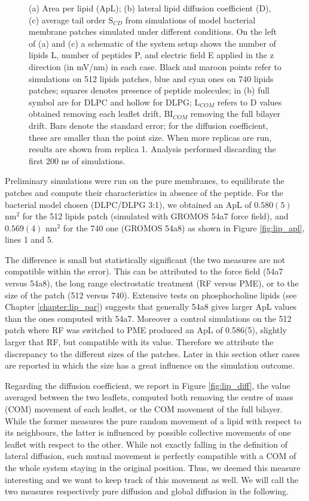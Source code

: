 \begin{figure}
\begin{minipage}{5.7cm}
\end{minipage}
\caption[ApL, D and S$_{CD}$ for membrane simulations]{(a) Area per lipid (ApL); (b) lateral lipid diffusion coefficient (D), (c) average tail order S$_{CD}$ from simulations of model bacterial membrane patches simulated under different conditions. On the left of (a) and (c) a schematic of the system setup shows the number of lipids L, number of peptides P, and electric field E applied in the z direction (in mV/nm) in each case. Black and maroon points refer to simulations on 512 lipids patches, blue and cyan ones on 740 lipids patches; squares denotes presence of peptide molecules; in (b) full symbol are for DLPC and hollow for DLPG; L$_{COM}$ refers to D values obtained removing each leaflet drift, BI$_{COM}$ removing the full bilayer drift. Bars denote the standard error; for the diffusion coefficient, these are smaller than the point size. When more replicas are run, results are shown from replica 1. Analysis performed discarding the first 200 ns of simulations.}
\label{fig:lipids_ApL_D}
\end{figure}

Preliminary simulations were run on the pure membranes, to equilibrate the patches and compute their characteristics in absence of the peptide.
%
For the bacterial model chosen (DLPC/DLPG 3:1), we obtained an ApL of $0.580(5)$ nm$^2$ for the 512 lipids patch (simulated with GROMOS 54a7 force field), and  $0.569(4)$ nm$^2$ for the 740 one (GROMOS 54a8) as shown in Figure \ref{fig:lip_apl}, lines 1 and 5.

The difference is small but statistically significant (the two measures are not compatible within the error).
%
This can be attributed to the force field (54a7 versus 54a8), the long range electrostatic treatment (RF versus PME), or to the size of the patch (512 versus 740). %
%
Extensive tests on phosphocholine lipids (see Chapter \ref{chapter:lip_par}) suggests that generally 54a8 gives larger ApL values than the ones computed with 54a7.
%
Moreover a control simulations on the 512 patch where RF was switched to PME produced an ApL of 0.586(5), slightly larger that RF, but compatible with its value.
%
Therefore we attribute the discrepancy to the different sizes of the patches. Later in this section other cases are reported in which the size has a great influence on the simulation outcome.

Regarding the diffusion coefficient, we report in Figure \ref{fig:lip_diff}, the value averaged between the two leaflets, computed both removing the centre of mass (COM) movement of each leaflet, or the COM movement of the full bilayer. While the former measures the pure random movement of a lipid with respect to its neighbours, the latter is influenced by possible collective movements of one leaflet with respect to the other. While not exactly falling in the definition of lateral diffusion, such mutual movement is perfectly compatible with a COM of the whole system staying in the original position. Thus, we deemed this measure interesting and we want to keep track of this movement as well. We will call the two measures respectively pure diffusion and global diffusion in the following.

